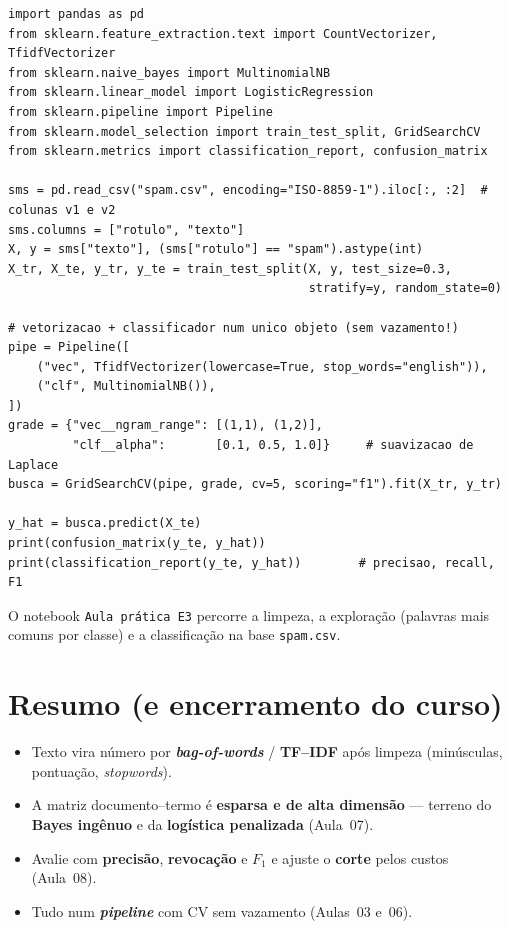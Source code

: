 \documentclass[11pt,a4paper]{article}
\begin{document}
\begin{lstlisting}
import pandas as pd
from sklearn.feature_extraction.text import CountVectorizer, TfidfVectorizer
from sklearn.naive_bayes import MultinomialNB
from sklearn.linear_model import LogisticRegression
from sklearn.pipeline import Pipeline
from sklearn.model_selection import train_test_split, GridSearchCV
from sklearn.metrics import classification_report, confusion_matrix

sms = pd.read_csv("spam.csv", encoding="ISO-8859-1").iloc[:, :2]  # colunas v1 e v2
sms.columns = ["rotulo", "texto"]
X, y = sms["texto"], (sms["rotulo"] == "spam").astype(int)
X_tr, X_te, y_tr, y_te = train_test_split(X, y, test_size=0.3,
                                          stratify=y, random_state=0)

# vetorizacao + classificador num unico objeto (sem vazamento!)
pipe = Pipeline([
    ("vec", TfidfVectorizer(lowercase=True, stop_words="english")),
    ("clf", MultinomialNB()),
])
grade = {"vec__ngram_range": [(1,1), (1,2)],
         "clf__alpha":       [0.1, 0.5, 1.0]}     # suavizacao de Laplace
busca = GridSearchCV(pipe, grade, cv=5, scoring="f1").fit(X_tr, y_tr)

y_hat = busca.predict(X_te)
print(confusion_matrix(y_te, y_hat))
print(classification_report(y_te, y_hat))        # precisao, recall, F1
\end{lstlisting}
O notebook \texttt{Aula prática E3} percorre a limpeza, a exploração
(palavras mais comuns por classe) e a classificação na base \texttt{spam.csv}.

\section*{Resumo (e encerramento do curso)}
\begin{itemize}[leftmargin=1.4cm]
  \item Texto vira número por \textbf{\emph{bag-of-words}} / \textbf{TF--IDF} após
        limpeza (minúsculas, pontuação, \emph{stopwords}).
  \item A matriz documento--termo é \textbf{esparsa e de alta dimensão} ---
        terreno do \textbf{Bayes ingênuo} e da \textbf{logística penalizada}
        (Aula~07).
  \item Avalie com \textbf{precisão}, \textbf{revocação} e \textbf{$F_1$} e ajuste o
        \textbf{corte} pelos custos (Aula~08).
  \item Tudo num \textbf{\emph{pipeline}} com CV sem vazamento (Aulas~03 e~06).
\end{itemize}
\end{document}

